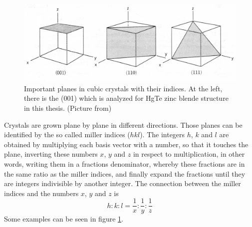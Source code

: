 	\begin{figure}[tbp]
		\centering
		\includegraphics[width=.8\linewidth]{andere_bilder/millersche_indizes_less.png}
		\caption{Important planes in cubic crystals with their indices. At the left, there is the (001) which is analyzed for HgTe zinc blende structure in this thesis. (Picture from\cite{Kittel})} \label{millersche_indizes}
	\end{figure}
	Crystals are grown plane by plane in different directions. 
	Those planes can be identified by the so called miller indices ($hkl$).
	The integers $h$, $k$ and $l$ are obtained by multiplying each basis vector with a number, so that it touches the plane, inverting these numbers $x$, $y$ and $z$ in respect to multiplication, in other words, writing them in a fractions denominator, whereby these fractions are in the same ratio as the miller indices, and finally expand the fractions until they are integers indivisible by another integer. The connection between the miller indices and the numbers $x$, $y$ and $z$ is
	\begin{equation}
		h : k : l = \frac{1}{x} : \frac{1}{y} : \frac{1}{z}
	\end{equation}
	Some examples can be seen in figure \ref{millersche_indizes}.

